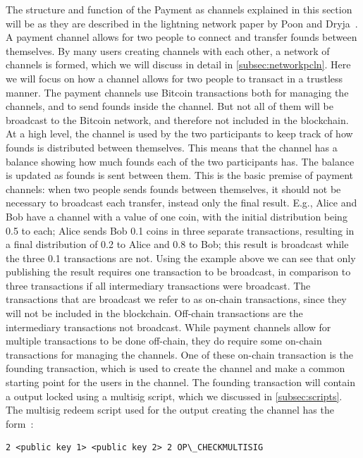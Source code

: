 The structure and function of the Payment as channels explained in this section will be as they are described in the lightning network paper by Poon and Dryja~\cite{poon2015bitcoin}. A payment channel allows for two people to connect and transfer founds between themselves. By many users creating channels with each other, a network of channels is formed, which we will discuss in detail in \cref{subsec:networkpcln}. Here we will focus on how a channel allows for two people to transact in a trustless manner. The payment channels use Bitcoin transactions both for managing the channels, and to send founds inside the channel. But not all of them will be broadcast to the Bitcoin network, and therefore not included in the blockchain. At a high level, the channel is used by the two participants to keep track of how founds is distributed between themselves. This means that the channel has a balance showing how much founds each of the two participants has. The balance is updated as founds is sent between them. This is the basic premise of payment channels: when two people sends founds between themselves, it should not be necessary to broadcast each transfer, instead only the final result. E.g., Alice and Bob have a channel with a value of one coin, with the initial distribution being 0.5 to each; Alice sends Bob 0.1 coins in three separate transactions, resulting in a final distribution of 0.2 to Alice and 0.8 to Bob; this result is broadcast while the three 0.1 transactions are not. 
Using the example above we can see that only publishing the result requires one transaction to be broadcast, in comparison to three transactions if all intermediary transactions were broadcast.
The transactions that are broadcast we refer to as on-chain transactions, since they will not be included in the blockchain. Off-chain transactions are the intermediary transactions not broadcast.
While payment channels allow for multiple transactions to be done off-chain, they do require some on-chain transactions for managing the channels. One of these on-chain transaction is the founding transaction, which is used to create the channel and make a common starting point for the users in the channel. The founding transaction will contain a output locked using a multisig script, which we discussed in \cref{subsec:scripts}. The multisig redeem script used for the output creating the channel has the form~\cite{bolt3}:

\begin{verbatim}
2 <public key 1> <public key 2> 2 OP\_CHECKMULTISIG
\end{verbatim}

